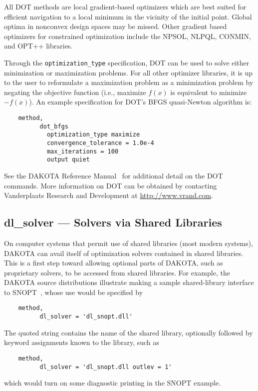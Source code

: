 All DOT methods are local gradient-based optimizers which are best
suited for efficient navigation to a local minimum in the vicinity of
the initial point. Global optima in nonconvex design spaces may be
missed. Other gradient based optimizers for constrained optimization
include the NPSOL, NLPQL, CONMIN, and OPT++ libraries.

Through the \texttt{optimization\_type} specification, DOT can be used
to solve either minimization or maximization problems. For all other
optimizer libraries, it is up to the user to reformulate a
maximization problem as a minimization problem by negating the
objective function (i.e., maximize $f(x)$ is equivalent to minimize
$-f(x)$). An example specification for DOT's BFGS quasi-Newton
algorithm is:
\begin{small}
\begin{verbatim}
    method,
          dot_bfgs
            optimization_type maximize
            convergence_tolerance = 1.0e-4
            max_iterations = 100
            output quiet
\end{verbatim}
\end{small}

See the DAKOTA Reference Manual~\cite{RefMan} for additional detail on the
DOT commands. More information on DOT can be obtained by contacting
Vanderplaats Research and Development at \url{http://www.vrand.com}.

\subsection{dl\_solver --- Solvers via Shared Libraries}\label{opt:software:dlsolver}

On computer systems that permit use of shared libraries (most modern systems),
DAKOTA can avail itself of optimization solvers contained in shared libraries.
This is a first step toward allowing optional parts of DAKOTA, such as
proprietary solvers, to be accessed from shared libraries.  For example,
the DAKOTA source distributions illustrate making
a sample shared-library interface to SNOPT~\cite{GilMS05},
whose use would be specified by
\begin{small}
\begin{verbatim}
    method,
          dl_solver = 'dl_snopt.dll'
\end{verbatim}
\end{small}
The quoted string contains the name of the shared library, optionally
followed by keyword assignments known to the library, such as
\begin{small}
\begin{verbatim}
    method,
          dl_solver = 'dl_snopt.dll outlev = 1'
\end{verbatim}
\end{small}
which would turn on some diagnostic printing in the SNOPT example.

